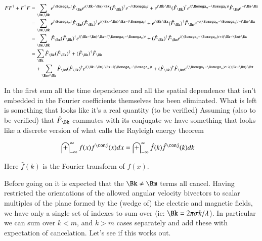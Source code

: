 \documentclass{article}
\newcommand{\IIinf}[0]{ \int_{-\infty}^\infty }
\begin{document}
\begin{align*}
FF^\dagger + F^\dagger F
&= 
\sum_{\Bm, \Bk} 
e^{i \Bomega_m t}
\hat{F}_{\Bm}
e^{i (\Bk-\Bm) \cdot \Bx}
(\hat{F}_{\Bk})^{\dagger}
e^{-i \Bomega_k t}
+
e^{i \Bk \cdot \Bx}
(\hat{F}_{\Bk})^{\dagger}
e^{i (\Bomega_m-\Bomega_k) t}
\hat{F}_{\Bm}
e^{-i \Bm \cdot \Bx} 
\\
&= 
\sum_{\Bm, \Bk} 
e^{i \Bomega_m t}
\hat{F}_{\Bm}
(\hat{F}_{\Bk})^{\dagger}
e^{i (\Bk-\Bm) \cdot \Bx -i \Bomega_k t}
+
e^{i \Bk \cdot \Bx}
(\hat{F}_{\Bk})^{\dagger}
\hat{F}_{\Bm}
e^{-i (\Bomega_m-\Bomega_k) t -i \Bm \cdot \Bx}
\\
&= 
\sum_{\Bm, \Bk} 
\hat{F}_{\Bm}
(\hat{F}_{\Bk})^{\dagger}
e^{i (\Bk-\Bm) \cdot \Bx -i (\Bomega_k-\Bomega_m) t}
+
(\hat{F}_{\Bk})^{\dagger}
\hat{F}_{\Bm}
e^{i (\Bomega_k-\Bomega_m) t +i (\Bk -\Bm) \cdot \Bx}
\\
&= 
\sum_{\Bk} 
\hat{F}_{\Bk}
(\hat{F}_{\Bk})^{\dagger}
+
(\hat{F}_{\Bk})^{\dagger}
\hat{F}_{\Bk} \\
&\quad+ 
\sum_{\Bm \ne \Bk} 
\hat{F}_{\Bm}
(\hat{F}_{\Bk})^{\dagger}
e^{i (\Bk-\Bm) \cdot \Bx -i (\Bomega_k-\Bomega_m) t}
+
(\hat{F}_{\Bk})^{\dagger}
\hat{F}_{\Bm}
e^{i (\Bomega_k-\Bomega_m) t +i (\Bk -\Bm) \cdot \Bx}
\\
\end{align*}

In the first sum all the time dependence and all the spatial dependence 
that isn't embedded in the Fourier coefficients themselves has been eliminated.
What is left is something that looks like it's a real quantity (to be verified)
Assuming (also to be verified) that $\hat{F}_{\Bk}$ commutes with its conjugate
we have something that looks 
like a discrete version of what \cite{haykin1994cs} calls
the Rayleigh energy theorem

\begin{align*}
\IIinf f(x)f^\conj(x) dx &= \IIinf \hat{f}(k)\hat{f}^\conj(k) dk
\end{align*}

Here $\hat{f}(k)$ is the Fourier transform of $f(x)$.

Before going on it is expected that
the $\Bk \ne \Bm$ terms all cancel.
Having restricted the orientations of the allowed angular velocity bivectors to scalar multiples of the plane formed by the (wedge of) the electric
and magnetic fields, we have only a single set of indexes to sum over (ie: $\Bk = 2 \pi \sigma k/ \lambda$).
In particular we can sum over $k < m$, and $k > m$ cases separately and add these
with expectation of cancelation.  Let's see if this works out.
\end{document}
